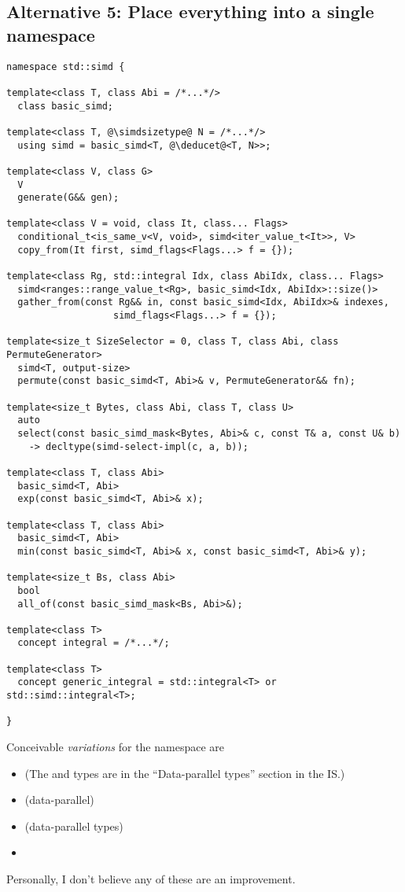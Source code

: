 \subsection{Alternative 5: Place everything into a single namespace}
\label{sec:singlenamespace}

\medskip\begin{lstlisting}[style=Vc]
namespace std::simd {

template<class T, class Abi = /*...*/>
  class basic_simd;

template<class T, @\simdsizetype@ N = /*...*/>
  using simd = basic_simd<T, @\deducet@<T, N>>;

template<class V, class G>
  V
  generate(G&& gen);

template<class V = void, class It, class... Flags>
  conditional_t<is_same_v<V, void>, simd<iter_value_t<It>>, V>
  copy_from(It first, simd_flags<Flags...> f = {});

template<class Rg, std::integral Idx, class AbiIdx, class... Flags>
  simd<ranges::range_value_t<Rg>, basic_simd<Idx, AbiIdx>::size()>
  gather_from(const Rg&& in, const basic_simd<Idx, AbiIdx>& indexes,
                   simd_flags<Flags...> f = {});

template<size_t SizeSelector = 0, class T, class Abi, class PermuteGenerator>
  simd<T, output-size>
  permute(const basic_simd<T, Abi>& v, PermuteGenerator&& fn);

template<size_t Bytes, class Abi, class T, class U>
  auto
  select(const basic_simd_mask<Bytes, Abi>& c, const T& a, const U& b)
    -> decltype(simd-select-impl(c, a, b));

template<class T, class Abi>
  basic_simd<T, Abi>
  exp(const basic_simd<T, Abi>& x);

template<class T, class Abi>
  basic_simd<T, Abi>
  min(const basic_simd<T, Abi>& x, const basic_simd<T, Abi>& y);

template<size_t Bs, class Abi>
  bool
  all_of(const basic_simd_mask<Bs, Abi>&);

template<class T>
  concept integral = /*...*/;

template<class T>
  concept generic_integral = std::integral<T> or std::simd::integral<T>;

}
\end{lstlisting}

Conceivable \emph{variations} for the \std{} namespace are
\begin{itemize}
  \item \std{} (The \simd and \mask types are in the “Data-parallel types” section in the IS.)
  \item \std{} (data-parallel)
  \item \std{} (data-parallel types)
  \item \std{}
\end{itemize}
Personally, I don't believe any of these are an improvement.

